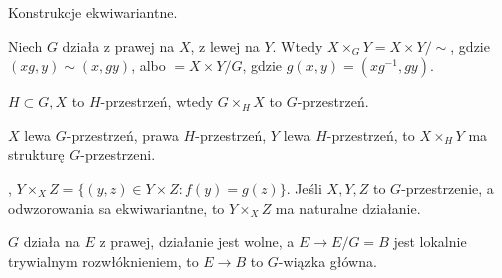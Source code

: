

 

 Konstrukcje ekwiwariantne.

 \begin{definicja}
  Niech $G$ działa z prawej na $X$, z lewej na $Y$. Wtedy $X \times_G Y = X \times Y / \sim$, gdzie $(xg, y) \sim (x,gy)$, albo $=X \times Y / G$, gdzie $g(x,y) = (xg^{-1}, gy)$.
 \end{definicja}
 
 \begin{definicja}
  $H \subset G, X$ to $H$-przestrzeń, wtedy $G \times_H X$ to $G$-przestrzeń.
 \end{definicja}
 
 \begin{uwaga}
  $X$ lewa $G$-przestrzeń, prawa $H$-przestrzeń, $Y$ lewa $H$-przestrzeń, to $X \times_H Y$ ma strukturę $G$-przestrzeni.
 \end{uwaga}
 
 \begin{definicja}, $Y \times_X Z = \{ (y,z) \in Y \times Z: f(y) = g(z) \}$.
 Jeśli $X,Y,Z$ to $G$-przestrzenie, a odwzorowania sa ekwiwariantne, to $Y \times_X Z$ ma naturalne działanie.
 \end{definicja}
 
 \begin{definicja}
 \end{definicja}
 
 \begin{definicja}
  $G$ działa na $E$ z prawej, działanie jest wolne, a $E \to E/G=B$ jest lokalnie trywialnym rozwłóknieniem, to $E\to B$ to $G$-wiązka główna.
 \end{definicja}
 
